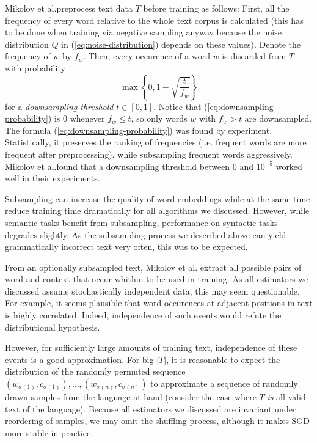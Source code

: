 \documentclass{amsart}
\theoremstyle{plain}
\theoremstyle{definition}
\begin{document}
Mikolov et al.\@ preprocess text data $T$ before training as follows:
First, all the frequency of every word relative to the whole text corpus is calculated (this has to be done when training via negative sampling anyway because the noise distribution $Q$ in (\ref{eq:noise-distribution}) depends on these values).
Denote the frequency of $w$ by $f_w$.
Then, every occurence of a word $w$ is discarded from $T$ with probability
\begin{equation}
  \label{eq:downsampling-probability}
  \max \left\{0, 1 - \sqrt{\frac{t}{f_w}} \right\}
\end{equation}
for a \emph{downsampling threshold} $t \in [0, 1]$.
Notice that (\ref{eq:downsampling-probability}) is 0 whenever $f_w \leq t$, so only words $w$ with $f_w > t$ are downsampled.
The formula (\ref{eq:downsampling-probability}) was found by experiment.
Statistically, it preserves the ranking of frequencies (i.e. frequent words are more frequent after preprocessing), while subsampling frequent words aggressively.
Mikolov et al.\@ found that a downsampling threshold between $0$ and $10^{-5}$ worked well in their experiments.

Subsampling can increase the quality of word embeddings while at the same time reduce training time dramatically for all algorithms we discussed.
However, while semantic tasks benefit from subsampling, performance on syntactic tasks degrades slightly.
As the subsampling process we described above can yield grammatically incorrect text very often, this was to be expected.

From an optionally subsampled text, Mikolov et al. extract all possible pairs of word and context that occur whithin to be used in training.
As all estimators we discussed assume stochastically independent data, this may seem questionable.
For example, it seems plausible that word occurences at adjacent positions in text is highly correlated.
Indeed, independence of such events would refute the distributional hypothesis.

However, for sufficiently large amounts of training text, independence of these events is a good approximation.
For big $|T|$, it is reasonable to expect the distribution of the randomly permuted sequence $(w_{\sigma(1)}, c_{\sigma(1)}), \dots, (w_{\sigma(n)}, c_{\sigma(n)})$ to approximate a sequence of randomly drawn samples from the language at hand (consider the case where $T$ \emph{is} all valid text of the language).
Because all estimators we discussed are invariant under reordering of samples, we may omit the shuffling process, although it makes SGD more stable in practice.
\end{document}
